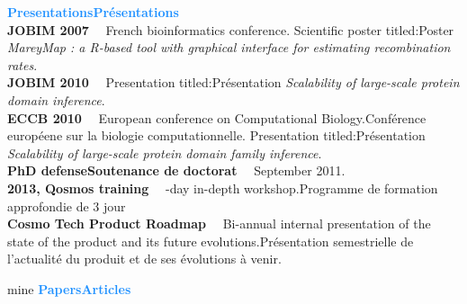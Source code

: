 \documentclass[a4paper]{article}
\newcommand\enfr[2]{\ifdefined\doen#1\else#2\fi\xspace}
\newcommand\heading[1]{\Large\textsf{\textbf{\textcolor{DodgerBlue}{#1}}}\normalsize}
\newcommand\sideentry[1]{\normalsize\textbf{#1}~~}
\begin{document}
\begin{minipage}[t]{0.27\textwidth}
  \heading{\enfr{Presentations}{Présentations}}\\

  \sideentry{JOBIM 2007} \enfr{French bioinformatics conference. Scientific poster titled:}{Poster} \textit{MareyMap : a R-based tool with graphical interface for estimating recombination rates}. \\

  \sideentry{JOBIM 2010} \enfr{Presentation titled:}{Présentation} \textit{Scalability of large-scale protein domain inference}.\\

  \sideentry{ECCB 2010} \enfr{European conference on Computational Biology.}{Conférence européene sur la biologie computationnelle.} \enfr{Presentation titled:}{Présentation} \textit{Scalability of large-scale protein domain family inference}. \\

  \sideentry{\enfr{PhD defense}{Soutenance de doctorat}} September 2011. \\

  \sideentry{2013, Qosmos training} \enfr{3-day in-depth workshop.}{Programme de formation approfondie de 3 jour} \\

  \sideentry{Cosmo Tech Product Roadmap} \enfr{Bi-annual internal
  presentation of the state of the product and its future
  evolutions.}
  {Présentation semestrielle de l'actualité du produit et de ses
    évolutions à venir.}\\

  \begin{btSect}[plain]{mine}
    \heading{\enfr{Papers}{Articles}}
    \btPrintAll
  \end{btSect}
\end{minipage}
\end{document}
